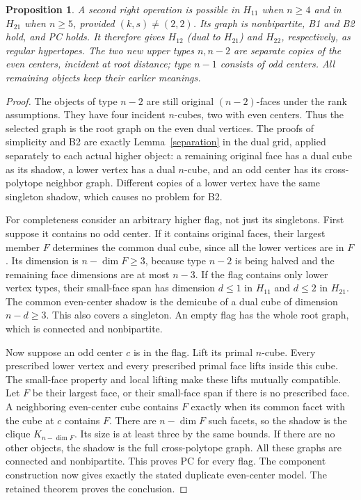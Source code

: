 \documentclass[11pt,a4paper]{article}
\newtheorem{proposition}[theorem]{Proposition}
\begin{document}
\begin{proposition}\label{oppositesecond}
A second right operation is possible in $H_{11}$ when $n\ge4$
and in $H_{21}$ when $n\ge5$, provided $(k,s)\ne(2,2)$.
Its graph is nonbipartite, B1 and B2 hold, and PC holds. It
therefore gives $H_{12}$ (dual to $H_{21}$) and $H_{22}$,
respectively, as regular hypertopes.
The two new upper types $n,n-2$ are separate copies of the even
centers, incident at root distance; type $n-1$ consists of odd
centers. All remaining objects keep their earlier meanings.
\end{proposition}
\begin{proof}
The objects of type $n-2$ are still original $(n-2)$-faces under
the rank assumptions. They have four incident $n$-cubes, two
with even centers. Thus the selected graph is the root graph
on the even dual vertices. The proofs of simplicity and B2
are exactly Lemma~\ref{separation} in the dual grid, applied
separately to each actual higher object: a remaining original
face has a dual cube as its shadow, a lower vertex has a dual
$n$-cube, and an odd center has its cross-polytope neighbor graph.
Different copies of a lower vertex have the same singleton shadow,
which causes no problem for B2.

For completeness consider an arbitrary higher flag, not just its
singletons. First suppose it contains no odd center. If it contains
original faces, their largest member $F$ determines the common
dual cube, since all the lower vertices are in $F$. Its dimension
is $n-\dim F\ge3$, because type $n-2$ is being halved and
the remaining face dimensions are at most $n-3$.
If the flag contains only lower vertex types, their small-face
span has dimension $d\le1$ in $H_{11}$ and $d\le2$ in $H_{21}$.
The common even-center shadow is the demicube of a dual cube
of dimension $n-d\ge3$. This also covers a singleton. An empty
flag has the whole root graph, which is connected and nonbipartite.

Now suppose an odd center $c$ is in the flag. Lift its primal
$n$-cube. Every prescribed lower vertex and every prescribed
primal face lifts inside this cube. The small-face property and
local lifting make these lifts mutually compatible. Let $F$ be
their largest face, or their small-face span if there is no
prescribed face. A neighboring even-center cube contains $F$
exactly when its common facet with the cube at $c$ contains $F$.
There are $n-\dim F$ such facets, so the shadow is the clique
$K_{n-\dim F}$. Its size is at least three by the same bounds.
If there are no other objects, the shadow is the full
cross-polytope graph. All these graphs are connected and
nonbipartite. This proves PC for every flag. The component
construction now gives exactly the stated duplicate even-center
model. The retained theorem proves the conclusion.
\end{proof}
\end{document}
